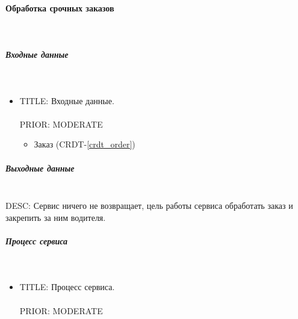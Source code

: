 \paragraph{Обработка срочных заказов} \mbox{} \\ \label{}

	\subparagraph{Входные данные} \mbox{} \\ \label{}

	  \begin{itemize}

	    \item{

	      TITLE: Входные данные.\\
	      \\
	      PRIOR: MODERATE\\

	    }

	    \begin{itemize}
	      \item Заказ (CRDT-\ref{crdt_order})
	    \end{itemize}

	  \end{itemize}

	\subparagraph{Выходные данные} \mbox{} \\

		DESC: Сервис ничего не возвращает, цель работы сервиса обработать заказ и закрепить за ним водителя.

    \subparagraph{Процесс сервиса} \mbox{} \\

        \begin{itemize}

             \item {
               TITLE: Процесс сервиса.\\
               \\
               PRIOR: MODERATE\\
             }

             \end{itemize}


